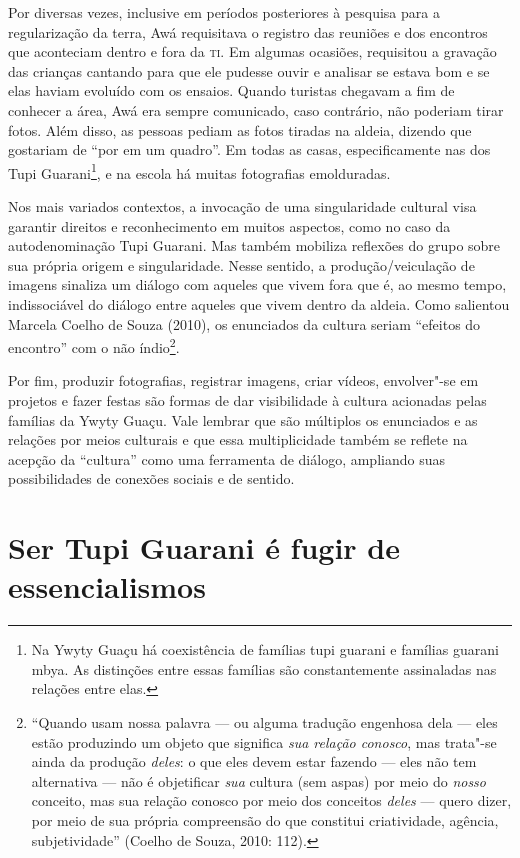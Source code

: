 Por diversas vezes, inclusive em períodos posteriores à pesquisa para a
regularização da terra, Awá requisitava o registro das reuniões e dos
encontros que aconteciam dentro e fora da \textsc{ti}. Em algumas ocasiões,
requisitou a gravação das crianças cantando para que ele pudesse ouvir
e analisar se estava bom e se elas haviam evoluído com os ensaios.
Quando turistas chegavam a fim de conhecer a área, Awá era sempre
comunicado, caso contrário, não poderiam tirar fotos. Além disso, as
pessoas pediam as fotos tiradas na aldeia, dizendo que gostariam de ``por
em um quadro''. Em todas as casas, especificamente nas dos Tupi
Guarani\footnote{Na Ywyty Guaçu há coexistência de famílias tupi
guarani e famílias guarani mbya. As distinções entre essas famílias são
constantemente assinaladas nas relações entre elas.}, e na escola há
muitas fotografias emolduradas.

Nos mais variados contextos, a invocação de uma singularidade cultural
visa garantir direitos e reconhecimento em muitos aspectos, como no
caso da autodenominação Tupi Guarani. Mas também mobiliza reflexões do
grupo sobre sua própria origem e singularidade. Nesse sentido, a
produção/veiculação de imagens sinaliza um diálogo com aqueles que
vivem fora que é, ao mesmo tempo, indissociável do diálogo entre
aqueles que vivem dentro da aldeia. Como salientou Marcela Coelho de
Souza (2010), os enunciados da cultura seriam ``efeitos do encontro'' com
o não índio\footnote{``Quando usam nossa palavra --- ou alguma tradução
engenhosa dela --- eles estão produzindo um objeto que significa \emph{sua
relação conosco}, mas trata"-se ainda da produção \emph{deles}: o que eles devem
estar fazendo --- eles não tem alternativa --- não é objetificar \emph{sua}
cultura (sem aspas) por meio do \emph{nosso} conceito, mas sua relação conosco
por meio dos conceitos \emph{deles} --- quero dizer, por meio de sua própria
compreensão do que constitui criatividade, agência, subjetividade''
(Coelho de Souza, 2010: 112).}.

Por fim, produzir fotografias, registrar imagens, criar vídeos,
envolver"-se em projetos e fazer festas são formas de dar visibilidade à
cultura acionadas pelas famílias da Ywyty Guaçu. Vale lembrar que são
múltiplos os enunciados e as relações por meios culturais e que essa
multiplicidade também se reflete na acepção da ``cultura'' como uma
ferramenta de diálogo, ampliando suas possibilidades de conexões
sociais e de sentido.

\section{Ser Tupi Guarani é fugir de essencialismos}


